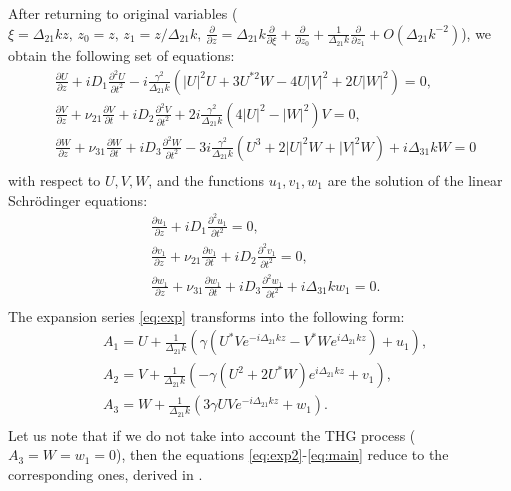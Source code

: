 \documentclass[a4paper, 12pt, onecolumn]{extarticle}
\begin{document}
After returning to original variables (\(\xi=\Delta_{21}kz,\,z_0=z,\,z_1=z/\Delta_{21}k,\,\frac{\partial}{\partial z}=\Delta_{21}k\frac{\partial}{\partial \xi}+\frac{\partial}{\partial z_0}+\frac{1}{\Delta_{21}k}\frac{\partial}{\partial z_1}+O(\Delta_{21}k^{-2})\)), we obtain the following set of equations:
\begin{equation}
\label{eq:main}
\begin{aligned}
&\frac{\partial U}{\partial z}+iD_1\frac{\partial^2 U}{\partial t^2}-i\frac{\gamma^2}{\Delta_{21} k}(|U|^2U+3U^{*2}W-4U|V|^2+2U|W|^2)=0,\\
&\frac{\partial V}{\partial z}+\nu_{21}\frac{\partial V}{\partial t}+iD_2\frac{\partial^2 V}{\partial t^2}+2i\frac{\gamma^2}{\Delta_{21} k}(4|U|^2-|W|^2)V=0,\\
&\frac{\partial W}{\partial z}+\nu_{31}\frac{\partial W}{\partial t}+iD_3\frac{\partial^2 W}{\partial t^2}-3i\frac{\gamma^2}{\Delta_{21} k}(U^3+2|U|^2W+|V|^2W)+i\Delta_{31}kW=0\\
\end{aligned}
\end{equation}
with respect to \(U,V,W\), and the functions \(u_1,v_1,w_1\) are the solution of the linear Schr\"{o}dinger equations:
\begin{equation}
\label{eq:main_2}
\begin{aligned}
&\frac{\partial u_1}{\partial z}+iD_1\frac{\partial^2 u_1}{\partial t^2}=0,\\
&\frac{\partial v_1}{\partial z}+\nu_{21}\frac{\partial v_1}{\partial t}+iD_2\frac{\partial^2 v_1}{\partial t^2}=0,\\
&\frac{\partial w_1}{\partial z}+\nu_{31}\frac{\partial w_1}{\partial t}+iD_3\frac{\partial^2 w_1}{\partial t^2}+i\Delta_{31}kw_1=0.\\
\end{aligned}
\end{equation}
The expansion series \eqref{eq:exp} transforms into the following form:
\begin{equation}
\label{eq:exp2}
\begin{aligned}
&A_1=U+\frac{1}{\Delta_{21}k}\left(\gamma(U^*Ve^{-i\Delta_{21}kz}-V^*We^{i\Delta_{21}kz})+u_1\right),\\
&A_2=V+\frac{1}{\Delta_{21}k}\left(-\gamma(U^2+2U^*W)e^{i\Delta_{21}kz}+v_1\right),\\
&A_3=W+\frac{1}{\Delta_{21}k}\left(3\gamma UVe^{-i\Delta_{21}kz}+w_1\right).\\
\end{aligned}
\end{equation}
Let us note that if we do not take into account the THG process (\(A_3=W=w_1=0\)), then the equations \eqref{eq:exp2}-\eqref{eq:main} reduce to the corresponding ones, derived in \cite{bib:n19}.
\end{document}
